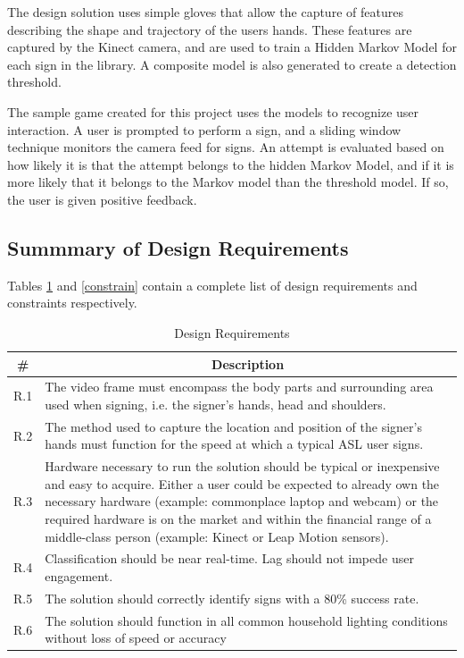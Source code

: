 \documentclass[12pt]{article}
\begin{document}
The design solution uses simple gloves that allow the capture of features describing the shape and trajectory of the users hands. These features are captured by the Kinect camera, and are used to train a Hidden Markov Model for each sign in the library. A composite model is also generated to create a detection threshold.

The sample game created for this project uses the models to recognize user interaction. A user is prompted to perform a sign, and a sliding window technique monitors the camera feed for signs. An attempt is evaluated based on how likely it is that the attempt belongs to the hidden Markov Model, and if it is more likely that it belongs to the Markov model than the threshold model. If so, the user is given positive feedback.

\subsection{Summmary of Design Requirements}
Tables \ref{require} and \ref{constrain} contain a complete list of design requirements and constraints respectively. 

\begin{table}[h]
\centering
\caption{Design Requirements}
\label{require}
\begin{tabular}{|l|p{15cm}|}
\hline
\multicolumn{1}{|c}{\textbf{\#}} & \multicolumn{1}{|c|}{\textbf{Description}} \\ \hline
R.1 & The video frame must encompass the body parts and surrounding area used when signing, i.e. the signer’s hands, head and shoulders. \\ \hline
R.2 & The method used to capture the location and position of the signer’s hands must function for the speed at which a typical ASL user signs. \\ \hline
R.3 & Hardware necessary to run the solution should be typical or inexpensive and easy to acquire. Either a user could be expected to already own the necessary hardware (example: commonplace laptop and webcam) or the required hardware is on the market and within the financial range of a middle-class person (example: Kinect or Leap Motion sensors). \\ \hline
R.4 & Classification should be near real-time. Lag should not impede user engagement. \\ \hline
R.5 & The solution should correctly identify signs with a 80\% success rate. \\ \hline
R.6 & The solution should function in all common household lighting conditions without loss of speed or accuracy \\ \hline
\end{tabular}
\end{table}
\end{document}
